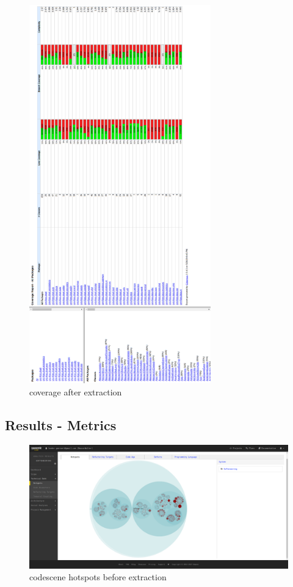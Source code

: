\documentclass{article}
\begin{document}
\newpage
\begin{figure}[H]
\centering
	\includegraphics[width=0.7\textwidth]{coverage/AFTER.png}
	\caption{coverage after extraction}
\end{figure}

\subsection{Results - Metrics}

\newpage
\begin{figure}[H]
\centering
	\includegraphics[width=\textwidth]{codescene/small/hotspots_before.png}
	\caption{codescene hotspots before extraction}
\end{figure}
\end{document}
